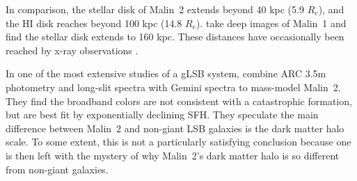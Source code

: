 \documentclass{emulateapj}
\newcommand\msun{\rm{M}_\odot}
\newcommand\HI{\ion{H}{1}}
\begin{document}
In comparison, the stellar disk of Malin~2 extends beyond 40 kpc (5.9 $R_e$), and the HI disk reaches beyond 100 kpc (14.8 $R_e$).  \citet{Galaz15} take deep images of Malin~1 and find the stellar disk extends to 160 kpc.  These distances have occasionally been reached by x-ray observations \citep{Buote12}. 







In one of the most extensive studies of a gLSB system, \citet{Kasparova14} combine ARC 3.5m photometry and long-slit spectra with Gemini spectra to mass-model Malin~2.  They find the broadband colors are not consistent with a catastrophic formation, but are best fit by exponentially declining SFH.  They speculate the main difference between Malin~2 and non-giant LSB galaxies is the dark matter halo scale.  To some extent, this is not a particularly satisfying conclusion because one is then left with the mystery of why Malin~2's dark matter halo is so different from non-giant galaxies.



\end{document}

